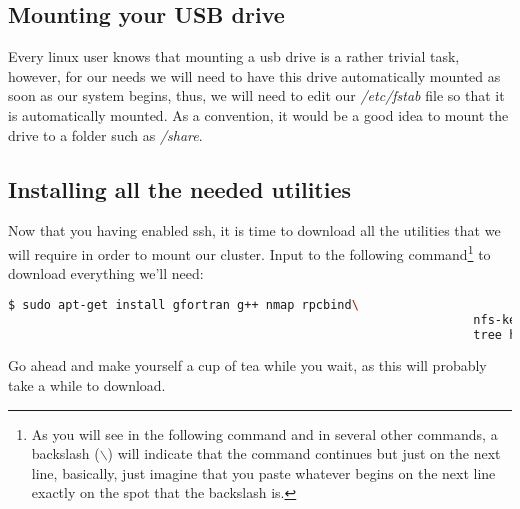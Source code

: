 \documentclass[]{article}
\begin{document}
                                                         \subsection{Mounting your USB drive}
                                                         Every linux user knows that mounting a usb drive is a rather trivial task, however, for our needs we will 
                                                         need to have this drive automatically mounted as soon as our system begins, thus, we will need to edit our 
                                                         \textit{/etc/fstab} file so that it is automatically mounted. As a convention, it would be a good idea to 
                                                         mount the drive to a folder such as \textit{/share}.

                                                         \subsection{Installing all the needed utilities}
                                                         Now that you having enabled ssh, it is time to download all the utilities that we will require in order to 
                                                         mount our cluster. Input to the following command\footnote{As you will see in the following command and in 
                                                             several other commands, a backslash ($\backslash$) will indicate that the command continues but just on the 
                                                                 next line, basically, just imagine that you paste whatever begins on the next line exactly on the spot that 
                                                                 the backslash is.} to download everything we'll need:
                                                                 \begin{lstlisting}[language=bash]
                                                                 $ sudo apt-get install gfortran g++ nmap rpcbind\ 
                                                                 nfs-kernel-server nfs-common tcl8.5 tcl8.5-dev vim\ 
                                                                 tree htop libssl-dev m4 gawk libc6-dev libstdc++6 libnss3
                                                                 \end{lstlisting}
                                                                 Go ahead and make yourself a cup of tea while you wait, as this will probably take a while to download.
\end{document}
